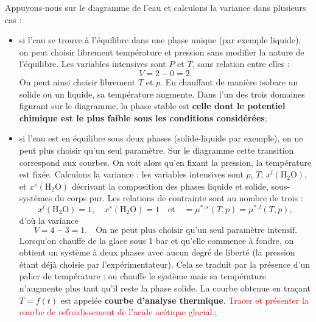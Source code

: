 \documentclass[11pt,a4paper]{report}
\begin{document}
Appuyons-nous sur le diagramme de l'eau et calculons la variance dans plusieurs cas :
\begin{itemize}
	\item si l'eau se trouve à l'équilibre dans une phase unique (par exemple liquide), on peut choisir librement température et pression sans modifier la nature de l'équilibre. Les variables intensives sont $P$ et $T$, sans relation entre elles :
	\begin{equation}
		V = 2 - 0 = 2.
	\end{equation}
	On peut ainsi choisir librement $T$ et $p$. En chauffant de manière isobare un solide ou un liquide, sa température augmente. Dans l'un des trois domaines figurant sur le diagramme, la phase stable est \textbf{celle dont le potentiel chimique est le plus faible sous les conditions considérées};\\
	
	\item si l'eau est en équilibre sous deux phases (solide-liquide par exemple), on ne peut plus choisir qu'un seul paramètre. Sur le diagramme cette transition correspond aux courbes. On voit alors qu'en fixant la pression, la température est fixée. Calculons la variance : les variables intensives sont $p$, $T$, $x^l(\text{H}_2\text{O})$, et $x^s(\text{H}_2\text{O})$ décrivant la composition des phases liquide et solide, sous-systèmes du corps pur. Les relations de contrainte sont au nombre de trois :
	\begin{equation}
		x^l(\text{H}_2\text{O}) = 1,\quad x^s(\text{H}_2\text{O}) = 1 
		\quad\text{et}\quad = \mu^{*,s}(T,p) = \mu^{*,l}(T,p),
	\end{equation}
	d'où la variance
	\begin{equation}
		V = 4 - 3 = 1.\quad\text{On ne peut plus choisir qu'un seul paramètre intensif.}
	\end{equation}
	Lorsqu'on chauffe de la glace sous 1 bar et qu'elle commence à fondre, on obtient un système à deux phases avec aucun degré de liberté (la pression étant déjà choisie par l'expérimentateur). Cela se traduit par la présence d'un palier de température : on chauffe le système mais sa température n'augmente plus tant qu'il reste la phase solide. La courbe obtenue en traçant $T = f(t)$ est appelée \textbf{courbe d'analyse thermique}. \textcolor{red}{Tracer et présenter la courbe de refroidissement de l'acide acétique glacial.};\\


\end{itemize}
\end{document}

